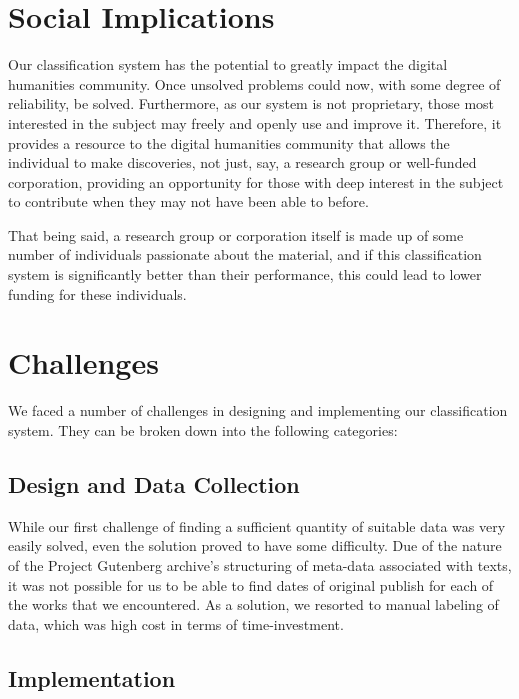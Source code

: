 \documentclass{article}
\begin{document}
\section{Social Implications}

Our classification system has the potential to greatly impact 
the digital humanities community. 
Once unsolved problems could now, with some degree of reliability, be solved. Furthermore, as our system 
is not proprietary, those most interested in the subject may freely and openly
use and improve it. 
Therefore, it provides a resource to the 
digital humanities community that allows the individual to make discoveries, 
not just, say, a research group or well-funded corporation, providing 
an opportunity for those with deep interest in the subject to contribute 
when they may not have been able to before. 

That being said, a research group or corporation itself 
is made up of some number of individuals passionate about the material, and 
if this classification system is significantly better than their 
performance, this could lead to lower funding for these individuals.  


\section{Challenges}

We faced a number of challenges in designing and implementing our classification system. 
They can be broken down into the following categories:

\subsection{Design and Data Collection}

While our first challenge of finding a sufficient quantity of suitable data was very 
  easily solved, even the solution proved to have some difficulty. Due of the nature
  of the Project Gutenberg archive's structuring of meta-data associated with texts, 
  it was not possible for us to be able to find dates of original publish for each of
  the works that we encountered. As a solution, we resorted to manual
  labeling of data, which was high cost in terms of time-investment.

\subsection{Implementation}
\end{document}

